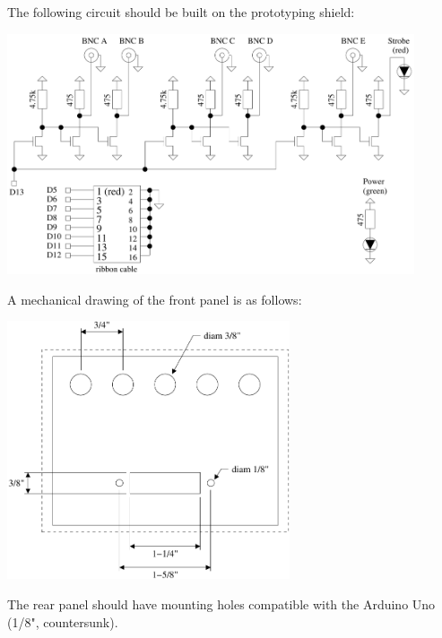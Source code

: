 \clearpage
The following circuit should be built on the prototyping shield:

\begin{center}
\includegraphics[width=0.9\textwidth]{drawings/gpio-dev-schem.pdf}
\end{center}

A mechanical drawing of the front panel is as follows:

\begin{center}
\includegraphics[height=3in]{drawings/gpio-dev-front-mech.pdf}
\end{center}

The rear panel should have mounting holes compatible with the Arduino Uno
(1/8", countersunk).

%

